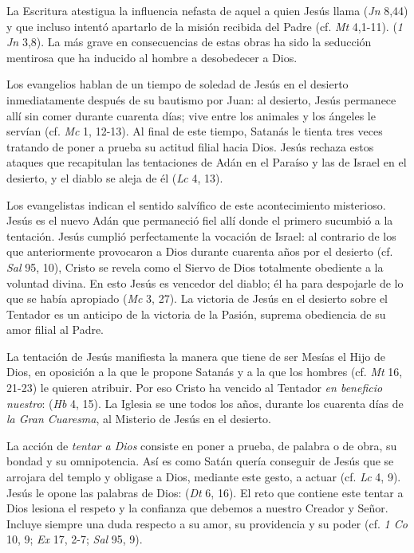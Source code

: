 \begin{ccebody}
 La Escritura atestigua la influencia nefasta de aquel a quien Jesús llama  (\textit{Jn} 8,44) y que incluso intentó apartarlo de la misión recibida del Padre (cf. \textit{Mt} 4,1-11).  (\textit{1 Jn} 3,8). La más grave en consecuencias de estas obras ha sido la seducción mentirosa que ha inducido al hombre a desobedecer a Dios.


 Los evangelios hablan de un tiempo de soledad de Jesús en el desierto inmediatamente después de su bautismo por Juan:  al desierto, Jesús permanece allí sin comer durante cuarenta días; vive entre los animales y los ángeles le servían (cf. \textit{Mc} 1, 12-13). Al final de este tiempo, Satanás le tienta tres veces tratando de poner a prueba su actitud filial hacia Dios. Jesús rechaza estos ataques que recapitulan las tentaciones de Adán en el Paraíso y las de Israel en el desierto, y el diablo se aleja de él  (\textit{Lc} 4, 13).

 Los evangelistas indican el sentido salvífico de este acontecimiento misterioso. Jesús es el nuevo Adán que permaneció fiel allí donde el primero sucumbió a la tentación. Jesús cumplió perfectamente la vocación de Israel: al contrario de los que anteriormente provocaron a Dios durante cuarenta años por el desierto (cf. \textit{Sal} 95, 10), Cristo se revela como el Siervo de Dios totalmente obediente a la voluntad divina. En esto Jesús es vencedor del diablo; él ha  para despojarle de lo que se había apropiado (\textit{Mc} 3, 27). La victoria de Jesús en el desierto sobre el Tentador es un anticipo de la victoria de la Pasión, suprema obediencia de su amor filial al Padre.

 La tentación de Jesús manifiesta la manera que tiene de ser Mesías el Hijo de Dios, en oposición a la que le propone Satanás y a la que los hombres (cf. \textit{Mt} 16, 21-23) le quieren atribuir. Por eso Cristo ha vencido al Tentador \textit{en beneficio nuestro}:  (\textit{Hb} 4, 15). La Iglesia se une todos los años, durante los cuarenta días de \textit{la Gran Cuaresma}, al Misterio de Jesús en el desierto.

 La acción de \textit{tentar a Dios} consiste en poner a prueba, de palabra o de obra, su bondad y su omnipotencia. Así es como Satán quería conseguir de Jesús que se arrojara del templo y obligase a Dios, mediante este gesto, a actuar (cf. \textit{Lc} 4, 9). Jesús le opone las palabras de Dios:  (\textit{Dt} 6, 16). El reto que contiene este tentar a Dios lesiona el respeto y la confianza que debemos a nuestro Creador y Señor. Incluye siempre una duda respecto a su amor, su providencia y su poder (cf. \textit{1 Co} 10, 9; \textit{Ex} 17, 2-7; \textit{Sal} 95, 9).
\end{ccebody}

